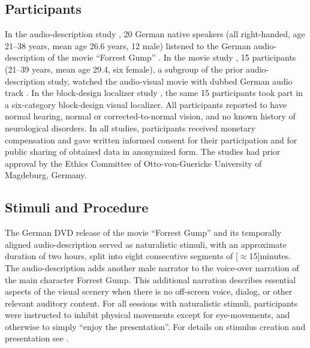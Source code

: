 \subsection{Participants}




In the audio-description study \citep{hanke2014audiomovie}, 20 German native
speakers (all right-handed, age 21–38 years, mean age 26.6 years, 12 male)
listened to the German audio-description \citep{ForrestGumpGermanAD} of the
movie ``Forrest Gump'' \citep{ForrestGumpMovie}.
In the movie study \citep{hanke2016simultaneous}, 15 participants (21–39 years,
mean age 29.4, six female), a subgroup of the prior audio-description study,
watched the audio-visual movie with dubbed German audio track
\citep{ForrestGumpDVD}.
In the block-design localizer study \citep{sengupta2016extension}, the same 15
participants took part in a six-category block-design visual localizer.
All participants reported to have normal hearing, normal or corrected-to-normal
vision, and no known history of neurological disorders.
In all studies, participants received monetary compensation and gave written
informed consent for their participation and for public sharing of obtained data
in anonymized form. The studies had prior approval by the Ethics Committee of
Otto-von-Guericke University of Magdeburg, Germany.


\subsection{Stimuli and Procedure}


The German DVD release \citep{ForrestGumpDVD} of the movie ``Forrest Gump''
\citep{ForrestGumpMovie} and its temporally aligned audio-description
\citep{ForrestGumpGermanAD} served as naturalistic stimuli, with an approximate
duration of two hours, split into eight consecutive segments of
\unit[$\approx$15]{minutes}.
The audio-description adds another male narrator to the voice-over narration of
the main character Forrest Gump. This additional narration describes essential
aspects of the visual scenery when there is no off-screen voice, dialog, or
other relevant auditory content.
For all sessions with naturalistic stimuli, participants were instructed to
inhibit physical movements except for eye-movements, and otherwise to simply
``enjoy the presentation''.
%
For details on stimulus creation and presentation see
\citet{hanke2014audiomovie, hanke2016simultaneous}.

